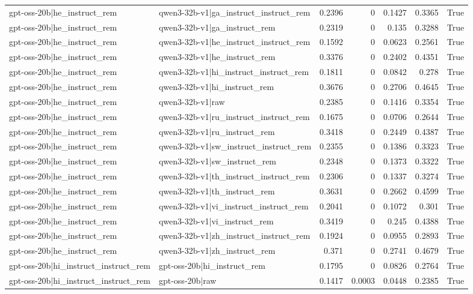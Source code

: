 \begin{table}
\begin{tabular}{l l r r r r l}
gpt-oss-20b|he_instruct_rem & qwen3-32b-v1|ga_instruct_instruct_rem & 0.2396 & 0 & 0.1427 & 0.3365 & True \\
gpt-oss-20b|he_instruct_rem & qwen3-32b-v1|ga_instruct_rem & 0.2319 & 0 & 0.135 & 0.3288 & True \\
gpt-oss-20b|he_instruct_rem & qwen3-32b-v1|he_instruct_instruct_rem & 0.1592 & 0 & 0.0623 & 0.2561 & True \\
gpt-oss-20b|he_instruct_rem & qwen3-32b-v1|he_instruct_rem & 0.3376 & 0 & 0.2402 & 0.4351 & True \\
gpt-oss-20b|he_instruct_rem & qwen3-32b-v1|hi_instruct_instruct_rem & 0.1811 & 0 & 0.0842 & 0.278 & True \\
gpt-oss-20b|he_instruct_rem & qwen3-32b-v1|hi_instruct_rem & 0.3676 & 0 & 0.2706 & 0.4645 & True \\
gpt-oss-20b|he_instruct_rem & qwen3-32b-v1|raw & 0.2385 & 0 & 0.1416 & 0.3354 & True \\
gpt-oss-20b|he_instruct_rem & qwen3-32b-v1|ru_instruct_instruct_rem & 0.1675 & 0 & 0.0706 & 0.2644 & True \\
gpt-oss-20b|he_instruct_rem & qwen3-32b-v1|ru_instruct_rem & 0.3418 & 0 & 0.2449 & 0.4387 & True \\
gpt-oss-20b|he_instruct_rem & qwen3-32b-v1|sw_instruct_instruct_rem & 0.2355 & 0 & 0.1386 & 0.3323 & True \\
gpt-oss-20b|he_instruct_rem & qwen3-32b-v1|sw_instruct_rem & 0.2348 & 0 & 0.1373 & 0.3322 & True \\
gpt-oss-20b|he_instruct_rem & qwen3-32b-v1|th_instruct_instruct_rem & 0.2306 & 0 & 0.1337 & 0.3274 & True \\
gpt-oss-20b|he_instruct_rem & qwen3-32b-v1|th_instruct_rem & 0.3631 & 0 & 0.2662 & 0.4599 & True \\
gpt-oss-20b|he_instruct_rem & qwen3-32b-v1|vi_instruct_instruct_rem & 0.2041 & 0 & 0.1072 & 0.301 & True \\
gpt-oss-20b|he_instruct_rem & qwen3-32b-v1|vi_instruct_rem & 0.3419 & 0 & 0.245 & 0.4388 & True \\
gpt-oss-20b|he_instruct_rem & qwen3-32b-v1|zh_instruct_instruct_rem & 0.1924 & 0 & 0.0955 & 0.2893 & True \\
gpt-oss-20b|he_instruct_rem & qwen3-32b-v1|zh_instruct_rem & 0.371 & 0 & 0.2741 & 0.4679 & True \\
gpt-oss-20b|hi_instruct_instruct_rem & gpt-oss-20b|hi_instruct_rem & 0.1795 & 0 & 0.0826 & 0.2764 & True \\
gpt-oss-20b|hi_instruct_instruct_rem & gpt-oss-20b|raw & 0.1417 & 0.0003 & 0.0448 & 0.2385 & True \\

\end{tabular}
\end{table}
